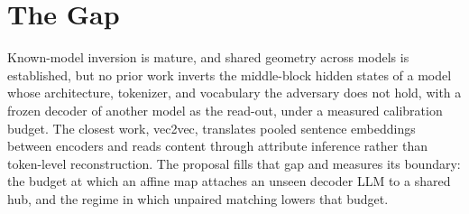 \section{The Gap}\label{sec:lit:gap}

Known-model inversion is mature, and shared geometry across models is established, but no prior work inverts the middle-block hidden states of a model whose architecture, tokenizer, and vocabulary the adversary does not hold, with a frozen decoder of another model as the read-out, under a measured calibration budget. The closest work, vec2vec, translates pooled sentence embeddings between encoders and reads content through attribute inference rather than token-level reconstruction. The proposal fills that gap and measures its boundary: the budget at which an affine map attaches an unseen decoder LLM to a shared hub, and the regime in which unpaired matching lowers that budget.

